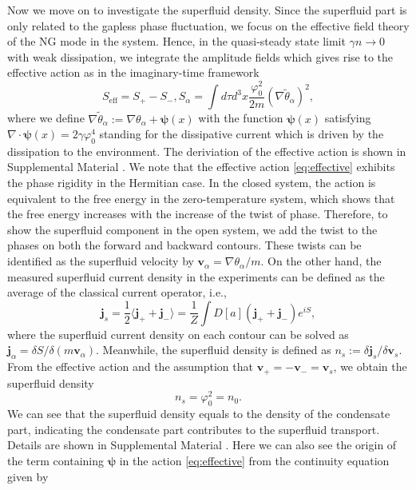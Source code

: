 \documentclass[aps,prl,twocolumn,superscriptaddress,]{revtex4-1}
\newcommand{\tmop}[1]{\ensuremath{\operatorname{#1}}}
\begin{document}
Now we move on to investigate the superfluid density. Since the superfluid
part is only related to the gapless phase fluctuation, we focus on
the effective field theory of the NG mode in the system. Hence, in
the quasi-steady state limit $\gamma n\rightarrow0$ with weak dissipation,
we integrate the amplitude fields which gives rise to the effective
action as in the imaginary-time framework~\citep{SupplementaryMaterial,PhysRevD.103.056020}
\begin{equation}
S_{\tmop{eff}}=S_{+}-S_{-},S_{\alpha}=\int d\tau d^{3}x\frac{\varphi_{0}^{2}}{2m}(\nabla\tilde{\theta}_{\alpha})^{2},\label{eq:effective}
\end{equation}
where we define $\nabla\tilde{\theta}_{\alpha}:=\nabla\theta_{\alpha}+\bm{\psi}(x)$
with the function $\bm{\psi}(x)$ satisfying $\nabla\cdot\bm{\psi}(x)=2\gamma\varphi_{0}^{4}$
standing for the dissipative current which is driven by the dissipation
to the environment. The deriviation of the effective action is shown
in Supplemental Material \citep{SupplementaryMaterial}. We note that
the effective action \eqref{eq:effective} exhibits the phase rigidity
in the Hermitian case. In the closed system, the action is equivalent
to the free energy in the zero-temperature system, which shows that
the free energy increases with the increase of the twist of phase. Therefore, to show
the superfluid component in the open system, we add the twist to the phases on both the
forward and backward contours. These twists can be identified as the superfluid velocity by \citep{Coleman_2015} $\bm{v}_{\alpha}=\nabla\theta_{\alpha}/m.$ On the other hand, the measured superfluid current density in the experiments can be defined as the average of the classical current operator, i.e., 
\begin{equation}
\bm{j}_{s}=\frac{1}{2}\langle\bm{j}_{+}+\bm{j}_{-}\rangle=\frac{1}{Z}\int D[a](\bm{j}_{+}+\bm{j}_{-})e^{iS},
\end{equation}
where the superfluid current density on each contour can be solved
as $\bm{j}_{\alpha}=\delta S/\delta(m\bm{v}_{\alpha})$. Meanwhile,
the superfluid density is defined as $n_s:=\delta\bm{j}_s/\delta\bm{v}_s$.
From the effective action and the assumption that $\bm{v}_{+}=-\bm{v}_{-}=\bm{v}_{s}$,
we obtain the superfluid density
\begin{equation}
	n_s=\varphi_0^2=n_0.\label{eq:supercurrent}
\end{equation}
We can see that the superfluid density equals to the density of the condensate part, indicating the condensate part contributes to the superfluid transport. Details are shown in Supplemental Material \cite{SupplementaryMaterial}. Here we can also see the origin of the term containing $\bm{\psi}$ in the action \eqref{eq:effective} from the continuity equation given by
\end{document}
